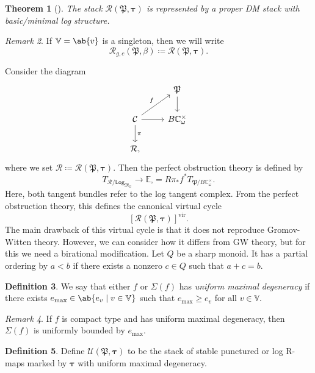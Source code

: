 \documentclass{amsart}
\newtheorem{thm}{Theorem}[section]
\theoremstyle{definition}
\newtheorem{defn}[thm]{Definition}
\theoremstyle{remark}
\newtheorem{rmk}[thm]{Remark}
\theoremstyle{plain}
\theoremstyle{definition}
\theoremstyle{remark}
\newcommand{\C}{\mathbb{C}}
\newcommand{\E}{\mathbb{E}}
\newcommand{\V}{\mathbb{V}}
\newcommand{\mc}[1]{\mathcal{#1}}
\newcommand{\mf}[1]{\mathfrak{#1}}
\newcommand{\mr}[1]{\mathrm{#1}}
\newcommand{\ms}[1]{\mathsf{#1}}
\newcommand{\1}{\mathbf{1}}
\newcommand{\2}{\mathbf{2}}
\newcommand{\3}{\mathbf{3}}
\newcommand{\vir}{\mr{vir}}
\begin{document}
\begin{thm}[{\cite{CJR2021,CJRpunctured}}]
    The stack \(\mc{R}(\mf{P},\bm{\tau})\) is represented by a proper DM stack with basic/minimal log structure.
\end{thm}

\begin{rmk}
    If \(\V = \ab\{v\}\) is a singleton, then we will write
    \[ \mc{R}_{g, c}(\mf{P}, \beta) \coloneqq \mc{R}(\mf{P}, \bm{\tau}). \]
\end{rmk}

Consider the diagram
\begin{equation*}
\begin{tikzcd}
    & \mf{P} \ar{d} \\
    \mc{C} \ar{ur}{f} \ar{d}{\pi} \ar{r} & B \C_{\omega}^{\times} \\
    \mc{R},
\end{tikzcd}
\end{equation*}
where we set \(\mc{R} \coloneqq \mc{R}(\mf{P}, \bm{\tau})\). Then the perfect obstruction theory is defined by
\[ T_{\mc{R}/\ms{Log}_{\mf{M}_G}} \to \E_{\square} = R \pi_* f^* T_{\mf{P}/B\C_{\omega}^{\times}}. \]
Here, both tangent bundles refer to the log tangent complex. From the perfect obstruction theory, this defines the canonical virtual cycle
\[ [\mc{R}(\mf{P}, \bm{\tau})]^{\vir}. \]
The main drawback of this virtual cycle is that it does not reproduce Gromov-Witten theory. However, we can consider how it differs from GW theory, but for this we need a birational modification. Let \(Q\) be a sharp monoid. It has a partial ordering by \(a < b\) if there exists a nonzero \(c \in Q\) such that \(a+c = b\).

\begin{defn}
    We say that either \(f\)  or \(\Sigma(f)\) has \textit{uniform maximal degeneracy} if there exists \(e_{\max} \in \ab\{e_v \mid v \in \V \}\) such that \(e_{\max} \geq e_v\) for all \(v \in \V\).
\end{defn}

\begin{rmk}
    If \(f\) is compact type and has uniform maximal degeneracy, then \(\Sigma(f)\) is uniformly bounded by \(e_{\max}\).
\end{rmk}

\begin{defn}
    Define \(\mc{U}(\mf{P}, \bm{\tau})\) to be the stack of stable punctured or log R-maps marked by \(\bm{\tau}\) with uniform maximal degeneracy.
\end{defn}
\end{document}
